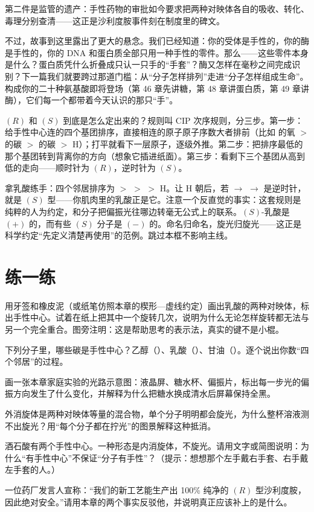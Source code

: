 第二件是监管的遗产：手性药物的审批如今要求把两种对映体各自的吸收、转化、毒理分别查清——这正是沙利度胺事件刻在制度里的碑文。

不过，故事到这里露出了更大的悬念。我们已经知道：你的受体是手性的，你的酶是手性的，你的 DNA 和蛋白质全部只用一种手性的零件。那么——这些零件本身是什么？蛋白质凭什么折叠成只认一只手的“手套”？酶又怎样在毫秒之间完成识别？下一篇我们就要跨过那道门槛：从“分子怎样排列”走进“分子怎样组成生命”。构成你的二十种氨基酸即将登场（第 46 章先讲糖，第 48 章讲蛋白质，第 49 章讲酶），它们每一个都带着今天认识的那只“手”。

\begin{tiaozhan}
$(R)$ 和 $(S)$ 到底是怎么定出来的？规则叫 CIP 次序规则，分三步。第一步：给手性中心连的四个基团排序，直接相连的原子原子序数大者排前（比如  的氧 $>$  的碳 $>$  的碳 $>$ H）；打平就看下一层原子，逐级外推。第二步：把排序最低的那个基团转到背离你的方向（想象它插进纸面）。第三步：看剩下三个基团从高到低的走向——顺时针为 $(R)$，逆时针为 $(S)$。

拿乳酸练手：四个邻居排序为  $>$  $>$  $>$ H。让 H 朝后，若  $\rightarrow$  $\rightarrow$  是逆时针，就是 $(S)$ 型——你肌肉里的乳酸正是它。注意一个反直觉的事实：这套规则是纯粹的人为约定，和分子把偏振光往哪边转毫无公式上的联系。$(S)$-乳酸是 $(+)$ 的，而有些 $(S)$ 分子是 $(-)$ 的。命名归命名，旋光归旋光——这正是科学约定“先定义清楚再使用”的范例。跳过本框不影响主线。
\end{tiaozhan}

\section*{练一练}

\begin{sikaoti}
\item 用牙签和橡皮泥（或纸笔仿照本章的楔形—虚线约定）画出乳酸的两种对映体，标出手性中心。试着在纸上把其中一个旋转几次，说明为什么无论怎样旋转都无法与另一个完全重合。图旁注明：这是帮助思考的表示法，真实的键不是小棍。
\item 下列分子里，哪些碳是手性中心？乙醇（）、乳酸（）、甘油（）。逐个说出你数“四个邻居”的过程。
\item 画一张本章家庭实验的光路示意图：液晶屏、糖水杯、偏振片，标出每一步光的偏振方向发生了什么变化，并解释为什么把糖水换成清水后屏幕保持全黑。
\item 外消旋体是两种对映体等量的混合物，单个分子明明都会旋光，为什么整杯溶液测不出旋光？用“每个分子都在拧光”的图景解释这种抵消。
\item 酒石酸有两个手性中心。一种形态是内消旋体，不旋光。请用文字或简图说明：为什么“有手性中心”不保证“分子有手性”？（提示：想想那个左手戴右手套、右手戴左手套的人。）
\item 一位药厂发言人宣称：“我们的新工艺能生产出 100\% 纯净的 $(R)$ 型沙利度胺，因此绝对安全。”请用本章的两个事实反驳他，并说明真正应该补上的是什么。
\end{sikaoti}
